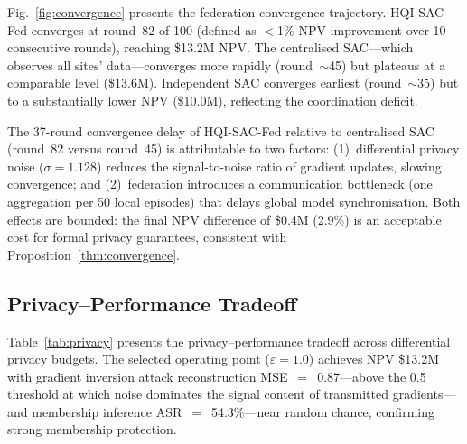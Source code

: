 \documentclass[journal]{IEEEtran}
\begin{document}
Fig.~\ref{fig:convergence} presents the federation convergence
trajectory. HQI-SAC-Fed converges at round~82 of 100 (defined as
$<$1\% NPV improvement over 10 consecutive rounds), reaching
\$13.2M NPV. The centralised SAC---which observes all sites'
data---converges more rapidly (round~$\sim$45) but plateaus at a
comparable level (\$13.6M). Independent SAC converges earliest
(round~$\sim$35) but to a substantially lower NPV (\$10.0M),
reflecting the coordination deficit.

The 37-round convergence delay of HQI-SAC-Fed relative to
centralised SAC (round~82 versus round~45) is attributable to two
factors: (1)~differential privacy noise ($\sigma = 1.128$) reduces
the signal-to-noise ratio of gradient updates, slowing convergence;
and (2)~federation introduces a communication bottleneck (one
aggregation per 50 local episodes) that delays global model
synchronisation. Both effects are bounded: the final NPV difference
of \$0.4M (2.9\%) is an acceptable cost for formal privacy
guarantees, consistent with Proposition~\ref{thm:convergence}.

\subsection{Privacy--Performance Tradeoff}
\label{sec:privacy}

Table~\ref{tab:privacy} presents the privacy--performance tradeoff
across differential privacy budgets. The selected operating point
($\varepsilon = 1.0$) achieves NPV \$13.2M with gradient inversion
attack reconstruction MSE~$=$~0.87---above the 0.5 threshold at which
noise dominates the signal content of transmitted gradients---and
membership inference ASR~$=$~54.3\%---near random chance, confirming
strong membership protection.
\end{document}
